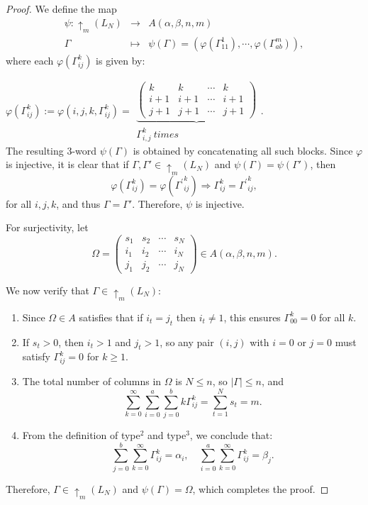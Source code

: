 \documentclass[11pt]{article}
\begin{document}
\begin{proof}
    We define the map
    $$
    \begin{array}{ccl}
        \psi: \uparrow_{m}(L_N) & \longrightarrow & A(\alpha, \beta, n, m)  \\
        \Gamma & \longmapsto & \psi(\Gamma) = (\varphi(\Gamma_{11}^1), \cdots, \varphi(\Gamma_{ab}^m)),
    \end{array}
    $$
    where each $\varphi(\Gamma_{ij}^k)$ is given by:
    
    
    
     $\varphi(\Gamma_{ij}^k):=\varphi(i,j,k,\Gamma_{ij}^{k})=\begin{array}{c}
		\underbrace{\left(\begin{matrix}
				k&k&\cdots&k\\
				i+1&i+1&\cdots&i+1\\
				j+1&j+1&\cdots&j+1\end{matrix}\right)}\\ \Gamma_{i,j}^k\  times\end{array}$.\\
    
    
    

    The resulting 3-word $\psi(\Gamma)$ is obtained by concatenating all such blocks.
    Since $\varphi$ is injective, it is clear that if $\Gamma, \Gamma' \in \uparrow_{m}(L_N)$ and $\psi(\Gamma) = \psi(\Gamma')$, then
  $$
\varphi(\Gamma_{ij}^k) = \varphi({\Gamma^{\prime}}_{ij}^k) \Rightarrow \Gamma_{ij}^k = {\Gamma^{\prime}}_{ij}^k,
$$
    for all $i,j,k$, and thus $\Gamma = \Gamma'$. Therefore, $\psi$ is injective.

    For surjectivity, let
    $$
    \Omega = \begin{pmatrix}
        s_1 & s_2 & \cdots & s_N \\
        i_1 & i_2 & \cdots & i_N \\
        j_1 & j_2 & \cdots & j_N
    \end{pmatrix} \in A(\alpha, \beta, n, m) .
    $$

    We now verify that $\Gamma \in \uparrow_{m}(L_N)$:
    \begin{enumerate}
        \item Since $\Omega \in A$ satisfies that if $i_t = j_t$ then $i_t \neq 1$, this ensures $\Gamma_{00}^k = 0$ for all $k$.
        \item If $s_t > 0$, then $i_t > 1$ and $j_t > 1$, so any pair $(i,j)$ with $i = 0$ or $j = 0$ must satisfy $\Gamma_{ij}^k = 0$ for $k \geq 1$.
        \item The total number of columns in $\Omega$ is $N \leq n$, so $|\Gamma| \leq n$, and        $$
        \sum_{k=0}^{\infty} \sum_{i=0}^a \sum_{j=0}^b k \Gamma_{ij}^k = \sum_{t=1}^{N} s_t = m.
        $$
        \item From the definition of type$^2$ and type$^3$, we conclude that:
        $$
        \sum_{j=0}^{b} \sum_{k=0}^{\infty} \Gamma_{ij}^k = \alpha_i, \quad
        \sum_{i=0}^{a} \sum_{k=0}^{\infty} \Gamma_{ij}^k = \beta_j.
        $$
    \end{enumerate}
 Therefore, $\Gamma \in \uparrow_{m}(L_N)$ and $\psi(\Gamma) = \Omega$, which completes the proof.
\end{proof}
\end{document}
